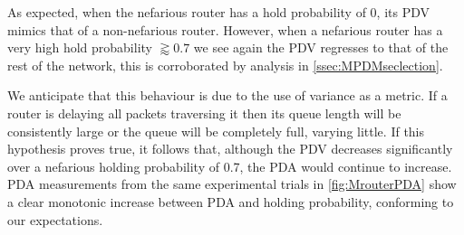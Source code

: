 As expected, when the nefarious router has a hold probability of 0, its PDV mimics that of a non-nefarious router. However, when a nefarious router has a very high hold probability $\gtrapprox 0.7$ we see again the PDV regresses to that of the rest of the network, this is corroborated by analysis in \cref{ssec:MPDMseclection}.\par
We anticipate that this behaviour is due to the use of variance as a metric. If a router is delaying all packets traversing it then its queue length will be consistently large or the queue will be completely full, varying little. If this hypothesis proves true, it follows that, although the PDV decreases significantly over a nefarious holding probability of 0.7, the PDA would continue to increase. PDA measurements from the same experimental trials in \ref{fig:MrouterPDA} show a clear monotonic increase between PDA and holding probability, conforming to our expectations.\par

